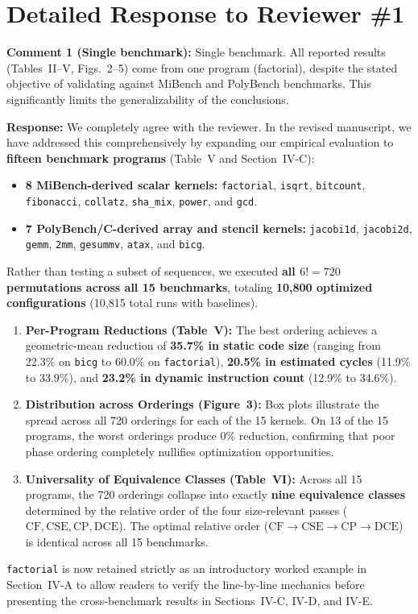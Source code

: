 \documentclass[10pt,a4paper]{article}
\begin{document}
\vspace{1em}
\section*{Detailed Response to Reviewer \#1}

\begin{reviewercomment}
\textbf{Comment 1 (Single benchmark):} Single benchmark. All reported results (Tables~II--V, Figs.~2--5) come from one program (factorial), despite the stated objective of validating against MiBench and PolyBench benchmarks. This significantly limits the generalizability of the conclusions.
\end{reviewercomment}

\noindent \textbf{Response:} We completely agree with the reviewer. In the revised manuscript, we have addressed this comprehensively by expanding our empirical evaluation to \textbf{fifteen benchmark programs} (Table~V and Section~IV-C):
\begin{itemize}[itemsep=1pt,parsep=0pt,topsep=2pt]
    \item \textbf{8 MiBench-derived scalar kernels:} \texttt{factorial}, \texttt{isqrt}, \texttt{bitcount}, \texttt{fibonacci}, \texttt{collatz}, \texttt{sha\_mix}, \texttt{power}, and \texttt{gcd}.
    \item \textbf{7 PolyBench/C-derived array and stencil kernels:} \texttt{jacobi1d}, \texttt{jacobi2d}, \texttt{gemm}, \texttt{2mm}, \texttt{gesummv}, \texttt{atax}, and \texttt{bicg}.
\end{itemize}
Rather than testing a subset of sequences, we executed \textbf{all $6! = 720$ permutations across all 15 benchmarks}, totaling \textbf{10,800 optimized configurations} (10,815 total runs with baselines).
\begin{enumerate}[itemsep=1pt,parsep=0pt,topsep=2pt]
    \item \textbf{Per-Program Reductions (Table~V):} The best ordering achieves a geometric-mean reduction of \textbf{35.7\% in static code size} (ranging from 22.3\% on \texttt{bicg} to 60.0\% on \texttt{factorial}), \textbf{20.5\% in estimated cycles} (11.9\% to 33.9\%), and \textbf{23.2\% in dynamic instruction count} (12.9\% to 34.6\%).
    \item \textbf{Distribution across Orderings (Figure~3):} Box plots illustrate the spread across all 720 orderings for each of the 15 kernels. On 13 of the 15 programs, the worst orderings produce 0\% reduction, confirming that poor phase ordering completely nullifies optimization opportunities.
    \item \textbf{Universality of Equivalence Classes (Table~VI):} Across all 15 programs, the 720 orderings collapse into exactly \textbf{nine equivalence classes} determined by the relative order of the four size-relevant passes ($\text{CF}, \text{CSE}, \text{CP}, \text{DCE}$). The optimal relative order ($\text{CF} \to \text{CSE} \to \text{CP} \to \text{DCE}$) is identical across all 15 benchmarks.
\end{enumerate}
\texttt{factorial} is now retained strictly as an introductory worked example in Section~IV-A to allow readers to verify the line-by-line mechanics before presenting the cross-benchmark results in Sections~IV-C, IV-D, and IV-E.
\end{document}
